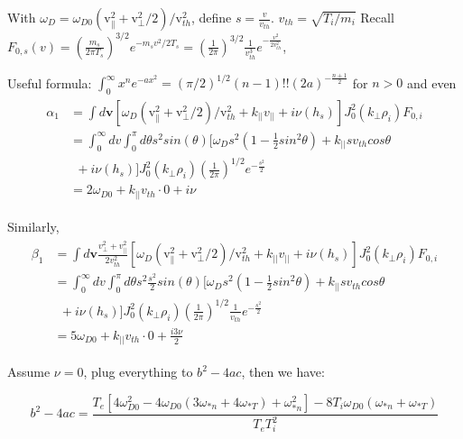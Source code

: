     With $\omega_D=\omega_{D0}\left(\mathrm{v}_{ \|}^{2}+\mathrm{v}_{\perp}^{2} / 2\right) / \mathrm{v}_{t h}^{2}$, define $s=\frac{v}{v_{th}}$. $v_{th}=\sqrt{T_i/m_i}$ Recall $F_{0,s}(v)=\left(\frac{m_s}{2\pi T_s}\right)^{3/2}e^{-m_sv^2/2T_s}=(\frac{1}{2\pi})^{3/2}\frac{1}{v_{th}^3}e^{-\frac{v^2}{2v_{th}^2}}$, 
    
    Useful formula: $\int^\infty_0 x^ne^{-ax^2}=(\pi/2)^{1/2}(n-1)!!(2a)^{-\frac{n+1}{2}}$ for $n>0$ and even
    \begin{eqnarray}
        \begin{aligned}
        \alpha_1{}&=
    \int d\textbf{v} \left[\omega_D\left(\mathrm{v}_{ \|}^{2}+\mathrm{v}_{\perp}^{2} / 2\right) / \mathrm{v}_{t h}^{2}
    + k_{||}v_{||}
    +i\nu(h_s)\right]
    J_0^2(k_\perp\rho_i)F_{0,i}\\
    &=\int^\infty_0dv \int^{\pi}_0 d\theta s^2sin(\theta) [\omega_D s^2(1-\frac{1}{2}sin^2\theta)
    + k_{||}s v_{th} cos\theta\\
    &\ \ +i\nu(h_s)]
    J_0^2(k_\perp\rho_i)(\frac{1}{2\pi})^{1/2}e^{-\frac{s^2}{2}}\\
    &= 2\omega_{D0}+k_{||}v_{th}\cdot 0 +i\nu
        \end{aligned}
    \end{eqnarray}
    
    Similarly,
        \begin{eqnarray}
        \begin{aligned}
        \beta_1{}&=
    \int d\textbf{v} \frac{v^2_{\perp}+v_{||}^2}{2v_{th}^2}\left[\omega_D\left(\mathrm{v}_{ \|}^{2}+\mathrm{v}_{\perp}^{2} / 2\right) / \mathrm{v}_{t h}^{2}
    + k_{||}v_{||}
    +i\nu(h_s)\right]
    J_0^2(k_\perp\rho_i)F_{0,i}\\
    &=\int^\infty_0dv \int^{\pi}_0 d\theta s^2\frac{s^2}{2} sin(\theta) [\omega_D s^2(1-\frac{1}{2}sin^2\theta)
    + k_{||}s v_{th} cos\theta\\
    &\ \ +i\nu(h_s)]
    J_0^2(k_\perp\rho_i)(\frac{1}{2\pi})^{1/2}\frac{1}{v_{th}}e^{-\frac{s^2}{2}}\\
    &= 5\omega_{D0}+k_{||}v_{th}\cdot 0 +\frac{i3\nu}{2}
        \end{aligned}
    \end{eqnarray}
    
    Assume $\nu=0$, plug everything to $b^2-4ac$, then we have:
    
    \begin{equation}
        b^2-4ac=\frac{T_e \left[4 \omega_{D0}^2-4 \omega_{D0} (3  \omega_{*n}+4  \omega_{*T})+ \omega_{*n}^2\right]-8 T_i \omega_{D0} ( \omega_{*n}+ \omega_{*T})}{T_e T_i^2}
    \end{equation}
    
